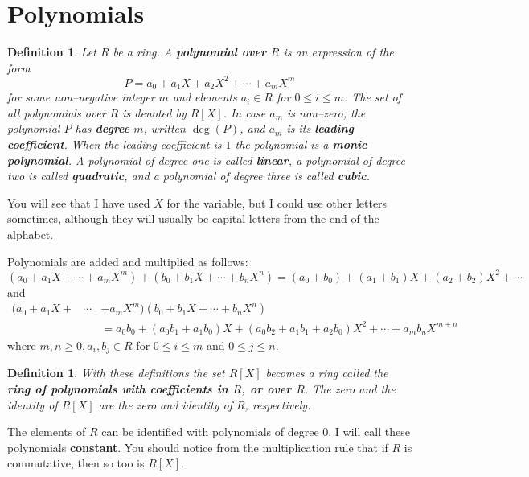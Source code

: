 \documentclass[11pt]{amsbook}
\newtheorem{definition}[theorem]{Definition}
\theoremstyle{definition}
\begin{document}
\section{Polynomials}
\begin{definition}
Let $R$ be a ring. A {\bf polynomial
over $R$} is an expression of the form $$P = a_0 + a_1 X + a_2
X^2 + \cdots + a_m X^m$$ for some non--negative integer $m$ and
elements $a_i\in R$ for $0\leqslant i\leqslant m$. The set of all
polynomials over $R$ is denoted by $R[X]$. In case $a_m$ is
non--zero, the polynomial $P$ has {\bf degree} $m$, written $\deg (P)$, and
$a_m$ is its {\bf leading coefficient}. When the leading coefficient is $1$ the polynomial is a {\bf monic polynomial}. A polynomial of degree one is called {\bf linear}, a polynomial of degree two is called {\bf quadratic}, and a polynomial of degree three is called {\bf cubic}.
\end{definition}

You will see that I have used $X$ for the variable, but I could use other letters sometimes, although they will usually be capital letters from the end of the alphabet.

Polynomials are added and
multiplied as follows:
$$(a_0 + a_1X + \cdots +a_mX^m) + (b_0 + b_1X + \cdots + b_nX^n) =
(a_0+b_0) + (a_1 + b_1)X + (a_2+b_2)X^2 + \cdots $$ and
\begin{eqnarray*} (a_0 + a_1X + &\cdots &+a_mX^m)(b_0 + b_1X + \cdots + b_nX^n) \\
&&= a_0b_0 + (a_0b_1 + a_1b_0)X + (a_0b_2 + a_1b_1 + a_2b_0)X^2 +
\cdots + a_mb_nX^{m+n}\end{eqnarray*} where $m,n\geqslant 0, a_i,b_j \in R$ for
$0\leqslant i\leqslant m$ and $0\leqslant j\leqslant n$.

\begin{definition} With these definitions the set
$R[X]$ becomes a ring called the {\bf ring of polynomials with
coefficients in $R$, or over $R$}. The zero and the identity of
$R[X]$ are the zero and identity of $R$, respectively.
\end{definition}
\begin{remarks} The elements of $R$ can be
identified with polynomials of degree $0$. I will call these polynomials {\bf constant}. You should notice from the multiplication rule that if $R$ is commutative, then so too is $R[X]$.
\end{remarks}
\medskip
\end{document}
